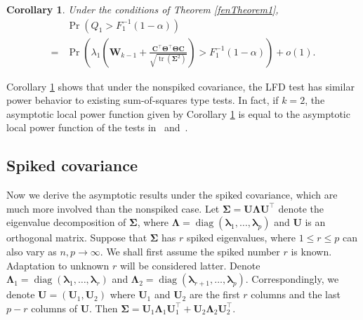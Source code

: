 \documentclass[12pt]{article} %
\DeclareMathOperator{\mytr}{tr}
\DeclareMathOperator{\mydiag}{diag}
\newcommand{\bC}{\mathbf{C}}
\newcommand{\bU}{\mathbf{U}}
\newcommand{\bW}{\mathbf{W}}
\newcommand{\bfsym}[1]{\ensuremath{\boldsymbol{#1}}}
\def\blambda {\bfsym {\lambda}}
\def\bLambda {\bfsym {\Lambda}}
\def\bSigma {\bfsym {\Sigma}}
\def\bTheta {\bfsym {\Theta}}
\newtheorem{corollary}{Corollary}
\theoremstyle{definition}
\begin{document}
\begin{corollary}\label{kuCor1}
    Under the conditions of Theorem \ref{fenTheorem1}, 
    \begin{equation*}
        \begin{split}
        &\Pr\left(
            Q_1>F_1^{-1}(1-\alpha)
        \right) 
        \\
        =&
        \Pr\left(
        \lambda_1\left(\bW_{k-1}+\frac{\bC^\top \bTheta^\top \bTheta \bC}{\sqrt{\mytr(\bSigma^2)} }\right)
        >F_1^{-1}(1-\alpha)
    \right)+o(1).
        \end{split}
    \end{equation*}
\end{corollary}
Corollary \ref{kuCor1} shows that under the nonspiked covariance, the LFD test has similar power behavior to existing sum-of-squares type tests.
In fact, if $k=2$, the asymptotic local power function given by Corollary \ref{kuCor1} is equal to the asymptotic local power function of the tests in~\citet{Bai1996Efiect} and~\citet{Chen2010A}.




\subsection{Spiked covariance}


Now we derive the asymptotic results under the spiked covariance, which are much more involved than the nonspiked case.
Let $\bSigma= \bU\bLambda \bU^\top$ denote the eigenvalue decomposition of $\bSigma$, where $\bLambda =\mydiag (\blambda_1,\ldots,\blambda_p)$ and $\bU$ is an orthogonal matrix.
Suppose that $\bSigma$ has $r$ spiked eigenvalues, where $1\leq r\leq p$ can also vary as $n,p\to \infty$.
    We shall first assume the spiked number $r$ is known.
    Adaptation to unknown $r$ will be considered latter.
Denote $\bLambda_1=\mydiag(\blambda_1,\ldots,\blambda_r)$ and $\bLambda_2=\mydiag(\blambda_{r+1},\ldots,\blambda_p)$.
Correspondingly, we denote $\bU=(\bU_1,\bU_2)$ where $\bU_1$ and $\bU_2$ are the first $r$ columns and the last $p-r$ columns of $\bU$.
Then $\bSigma=\bU_1\bLambda_1 \bU_1^\top+\bU_2\bLambda_2 \bU_2^\top$.
\end{document}
